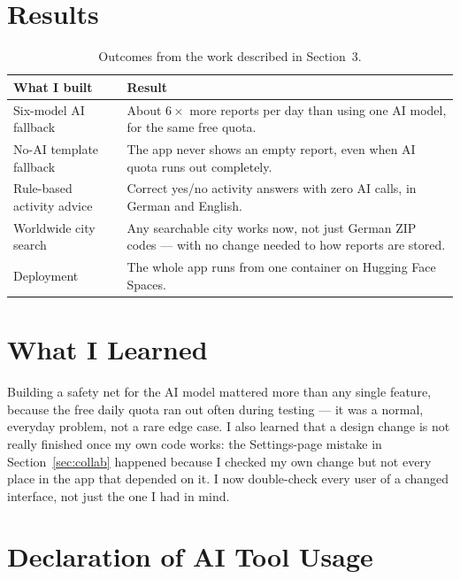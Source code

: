 \documentclass[11pt, a4paper]{article}
\begin{document}
\section{Results}

\begin{table}[H]
  \centering
  \caption{Outcomes from the work described in Section~3.}
  \label{tab:results}
  \begin{tabularx}{\linewidth}{@{}lX@{}}
    \toprule
    \textbf{What I built} & \textbf{Result} \\
    \midrule
    Six-model AI fallback & About $6\times$ more reports per day than using one AI model,
      for the same free quota. \\[3pt]
    No-AI template fallback & The app never shows an empty report, even when AI quota
      runs out completely. \\[3pt]
    Rule-based activity advice & Correct yes/no activity answers with zero AI calls, in
      German and English. \\[3pt]
    Worldwide city search & Any searchable city works now, not just German ZIP codes ---
      with no change needed to how reports are stored. \\[3pt]
    Deployment & The whole app runs from one container on Hugging Face Spaces. \\
    \bottomrule
  \end{tabularx}
\end{table}

\section{What I Learned}

Building a safety net for the AI model mattered more than any single feature, because the
free daily quota ran out often during testing --- it was a normal, everyday problem, not a
rare edge case. I also learned that a design change is not really finished once my own code
works: the Settings-page mistake in Section~\ref{sec:collab} happened because I checked my
own change but not every place in the app that depended on it. I now double-check every
user of a changed interface, not just the one I had in mind.

\section{Declaration of AI Tool Usage}
\end{document}
